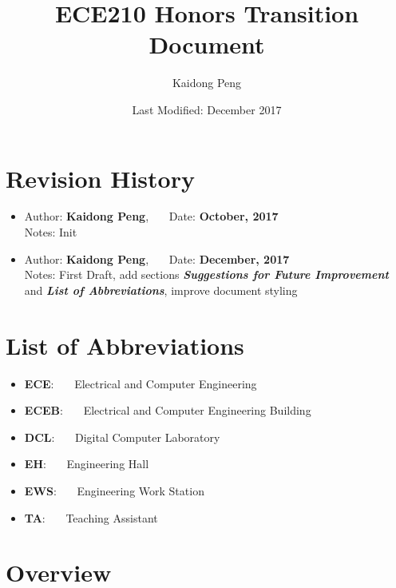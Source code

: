 \documentclass[12pt]{article}
\title{ECE210 Honors Transition Document}
\author{Kaidong Peng} %
\date{Last Modified: December 2017} %
\makeatletter
\renewcommand\tableofcontents{%
  \null\hfill\textbf{\Large\contentsname}\hfill\null\par
  \@mkboth{\MakeUppercase\contentsname}{\MakeUppercase\contentsname}%
  \@starttoc{toc}%
}
\newcommand{\RevisionHistoryItem}[3]{
    \item {
        Author: \textbf{#1}, \ \ \  Date: \textbf{#2}
    } \\
    Notes: #3
}
\newcommand{\AbbreviationItem}[2]{
    \item {
        \textbf{#1}: \ \ \ {#2}
    } 
}
\makeatother
\begin{document}
\null  %
\nointerlineskip  %
\vfill
\let\snewpage \newpage
\let\newpage \relax
\maketitle
\let \newpage \snewpage
\vfill
\newpage

\tableofcontents
\newpage

\section*{Revision History}
    \begin{itemize}
        \RevisionHistoryItem{Kaidong Peng}{October, 2017}
        {Init}
        \RevisionHistoryItem{Kaidong Peng}{December, 2017}
        {First Draft, add sections \textbf{\textit{Suggestions for Future Improvement}} and \textbf{\textit{List of Abbreviations}}, improve document styling}
    \end{itemize}

\newpage

\section*{List of Abbreviations}
    \begin{itemize}
        \AbbreviationItem{ECE}{Electrical and Computer Engineering}
        \AbbreviationItem{ECEB}{Electrical and Computer Engineering Building}
        \AbbreviationItem{DCL}{Digital Computer Laboratory}
        \AbbreviationItem{EH}{Engineering Hall}
        \AbbreviationItem{EWS}{Engineering Work Station}
        \AbbreviationItem{TA}{Teaching Assistant}
    \end{itemize}

\newpage

\section{Overview}
\newpage
\end{document}
